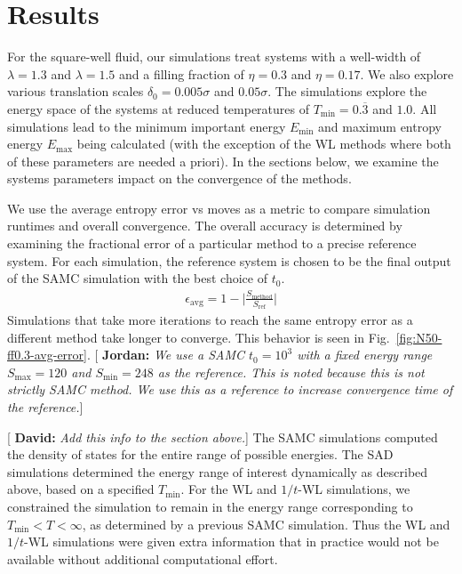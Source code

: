 \documentclass[letterpaper,twocolumn,amsmath,amssymb,pre,aps,10pt]{revtex4-1}
\newcommand{\green}[1]{{\bf \color{green} #1}}
\newcommand{\blue}[1]{{\bf \color{blue} #1}}
\newcommand{\davidsays}[1]{{\color{red} [\green{David:} \emph{#1}]}}
\newcommand{\jpsays}[1]{{\color{red} [\blue{Jordan:} \emph{#1}]}}
\begin{document}
\section{Results}\label{sec:results}

For the square-well fluid, our simulations treat systems with a
well-width of $\lambda = 1.3$ and $\lambda = 1.5$ and a filling fraction of
$\eta = 0.3$ and $\eta = 0.17$. We also explore various translation scales $\delta_0 = 0.005\sigma$ and
$0.05\sigma$. The simulations explore the
energy space of the systems at reduced temperatures of
$T_{\text{min}} = 0.\overline{3}$ and $1.0$.  All simulations lead to the minimum important
energy $E_{\min}$ and maximum entropy energy $E_{\max}$
being calculated (with the exception of the WL methods where both
of these parameters are needed a priori).  In the sections below, we
examine the systems parameters impact on the convergence of the methods.

We use the average entropy error vs moves as a metric to compare
simulation runtimes and overall convergence. The overall accuracy
is determined by examining the fractional error of a particular method to
a precise reference system. For each simulation, the reference system
is chosen to be the final output of the SAMC simulation with the best
choice of $t_0$.
\begin{align}
\epsilon_\text{avg} = 1 - \bigg\lvert\frac{S_\text{method}}{S_\text{ref}}\bigg\rvert
\end{align}
Simulations that take more iterations to reach the same entropy error as a
different method take longer to converge. This behavior is seen in
Fig.~\ref{fig:N50-ff0.3-avg-error}.
\jpsays{We use a SAMC $t_0 = 10^3$ with a fixed energy range $S_{\max} = 120$ and $S_{\min} = 248$ as the reference.
This is noted because this is not strictly SAMC method. We use this as a reference to increase convergence time of the
reference.}

\davidsays{Add this info to the section above.}  The SAMC simulations
computed the density of states for the entire range of possible
energies.  The SAD simulations determined the energy range of interest
dynamically as described above, based on a specified $T_{\min}$.  For
the WL and $1/t$-WL simulations, we constrained the simulation to
remain in the energy range corresponding to $T_{\min} < T < \infty$,
as determined by a previous SAMC simulation.  Thus the WL and $1/t$-WL
simulations were given extra information that in practice would not be
available without additional computational effort.
\end{document}
